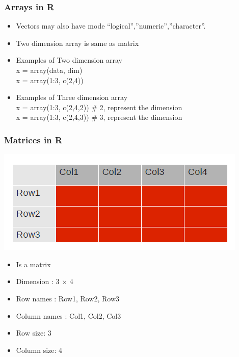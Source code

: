 \documentclass[12pt]{beamer}
\begin{document}
\begin{frame}[fragile]
\frametitle{Arrays in R}
\begin{itemize}\justifying
	\item Vectors may also have mode “logical”,”numeric”,”character”.
	\item Two dimension array is same as matrix
	\item Examples of Two dimension array\\
	x = array(data, dim)\\
	x = array(1:3, c(2,4))\\
	\item Examples of Three dimension array\\
	x = array(1:3, c(2,4,2)) \hfill\# 2, represent the dimension\\
	x = array(1:3, c(2,4,3)) \hfill\# 3, represent the dimension\\
\end{itemize}
\end{frame}

\begin{frame}[fragile]
\frametitle{Matrices in R}
\includegraphics[scale=0.5]{Matrix}
\begin{itemize}\justifying
	\item Is a matrix
		\item Dimension : 3 $\times$ 4
		\item Row names : Row1, Row2, Row3
		\item Column names : Col1, Col2, Col3
		\item Row size: 3
		\item Column size: 4
\end{itemize}
\end{frame}
\end{document}
